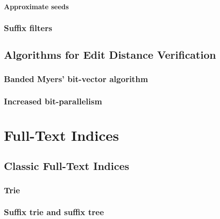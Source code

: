 \subsection{Approximate seeds}
\section{Suffix filters}

\chapter{Algorithms for Edit Distance Verification}
\section{Banded Myers' bit-vector algorithm}
\section{Increased bit-parallelism}


\part{Full-Text Indices}

\chapter{Classic Full-Text Indices}
\section{Trie}
\section{Suffix trie and suffix tree}

